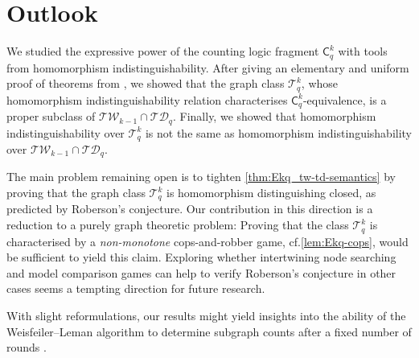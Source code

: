 \documentclass[a4paper,UKenglish,cleveref, autoref, thm-restate]{lipics-v2021}
\newcommand{\Ekq}{\ensuremath{\mathcal{T}_{q}^{k}}}
\begin{document}
\section{Outlook}
We studied the expressive power of the counting logic fragment $\mathsf{C}^k_q$ with tools from homomorphism indistinguishability. After giving an elementary and uniform proof of theorems from \cite{dvorak_recognizing_2010,grohe_counting_2020,dawar_lovasz-type_2021}, we showed that the graph class $\Ekq$, whose homomorphism indistinguishability relation characterises $\mathsf{C}^k_q$-equivalence, is a proper subclass of $\mathcal{TW}_{k-1} \cap \mathcal{TD}_q$. Finally, we showed that homomorphism indistinguishability over $\Ekq$ is not the same as homomorphism indistinguishability over $\mathcal{TW}_{k-1} \cap \mathcal{TD}_q$.

The main problem remaining open is to tighten \cref{thm:Ekq_tw-td-semantics} by proving that the graph class $\Ekq$ is homomorphism distinguishing closed, as predicted by Roberson's conjecture. Our contribution in this direction is a reduction to a purely graph theoretic problem: Proving that the class $\Ekq$ is characterised by a \emph{non-monotone} cops-and-robber game, cf.\@ \cref{lem:Ekq-cops}, would be sufficient to yield this claim. Exploring whether intertwining node searching and model comparison games can help to verify Roberson's conjecture in other cases seems a tempting direction for future research.

With slight reformulations, our results might yield insights into the ability of the Weisfeiler--Leman algorithm to determine subgraph counts after a fixed number of rounds \cite{rattan_weisfeiler-leman_2023,neuen_homomorphism-distinguishing_2023}. 
\newpage
\end{document}

